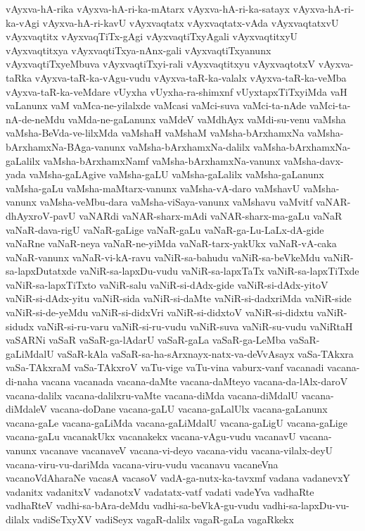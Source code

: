 {vAyxva-hA-rika
vAyxva-hA-ri-ka-mAtarx
vAyxva-hA-ri-ka-satayx
vAyxva-hA-ri-ka-vAgi
vAyxva-hA-ri-kavU
vAyxvaqtatx
vAyxvaqtatx-vAda
vAyxvaqtatxvU
vAyxvaqtitx
vAyxvaqTiTx-gAgi
vAyxvaqtiTxyAgali
vAyxvaqtitxyU
vAyxvaqtitxya
vAyxvaqtiTxya-nAnx-gali
vAyxvaqtiTxyanunx
vAyxvaqtiTxyeMbuva
vAyxvaqtiTxyi-rali
vAyxvaqtitxyu
vAyxvaqtotxV
vAyxva-taRka
vAyxva-taR-ka-vAgu-vudu
vAyxva-taR-ka-valalx
vAyxva-taR-ka-veMba
vAyxva-taR-ka-veMdare
vUyxha
vUyxha-ra-shimxnf
vUyxtapxTiTxyiMda
vaH
vaLanunx
vaM
vaMca-ne-yilalxde
vaMcasi
vaMci-suva
vaMci-ta-nAde
vaMci-ta-nA-de-neMdu
vaMda-ne-gaLanunx
vaMdeV
vaMdhAyx
vaMdi-su-venu
vaMsha
vaMsha-BeVda-ve-lilxMda
vaMshaH
vaMshaM
vaMsha-bArxhamxNa
vaMsha-bArxhamxNa-BAga-vanunx
vaMsha-bArxhamxNa-dalilx
vaMsha-bArxhamxNa-gaLalilx
vaMsha-bArxhamxNamf
vaMsha-bArxhamxNa-vanunx
vaMsha-davx-yada
vaMsha-gaLAgive
vaMsha-gaLU
vaMsha-gaLalilx
vaMsha-gaLanunx
vaMsha-gaLu
vaMsha-maMtarx-vanunx
vaMsha-vA-daro
vaMshavU
vaMsha-vanunx
vaMsha-veMbu-dara
vaMsha-viSaya-vanunx
vaMshavu
vaMvitf
vaNAR-dhAyxroV-pavU
vaNARdi
vaNAR-sharx-mAdi
vaNAR-sharx-ma-gaLu
vaNaR
vaNaR-dava-rigU
vaNaR-gaLige
vaNaR-gaLu
vaNaR-ga-Lu-LaLx-dA-gide
vaNaRne
vaNaR-neya
vaNaR-ne-yiMda
vaNaR-tarx-yakUkx
vaNaR-vA-caka
vaNaR-vanunx
vaNaR-vi-kA-ravu
vaNiR-sa-bahudu
vaNiR-sa-beVkeMdu
vaNiR-sa-lapxDutatxde
vaNiR-sa-lapxDu-vudu
vaNiR-sa-lapxTaTx
vaNiR-sa-lapxTiTxde
vaNiR-sa-lapxTiTxto
vaNiR-salu
vaNiR-si-dAdx-gide
vaNiR-si-dAdx-yitoV
vaNiR-si-dAdx-yitu
vaNiR-sida
vaNiR-si-daMte
vaNiR-si-dadxriMda
vaNiR-side
vaNiR-si-de-yeMdu
vaNiR-si-didxVri
vaNiR-si-didxtoV
vaNiR-si-didxtu
vaNiR-sidudx
vaNiR-si-ru-varu
vaNiR-si-ru-vudu
vaNiR-suva
vaNiR-su-vudu
vaNiRtaH
vaSARNi
vaSaR
vaSaR-ga-lAdarU
vaSaR-gaLa
vaSaR-ga-LeMba
vaSaR-gaLiMdalU
vaSaR-kAla
vaSaR-sa-ha-sArxnayx-natx-va-deVvAsayx
vaSa-TAkxra
vaSa-TAkxraM
vaSa-TAkxroV
vaTu-vige
vaTu-vina
vaburx-vanf
vacanadi
vacana-di-naha
vacana
vacanada
vacana-daMte
vacana-daMteyo
vacana-da-lAlx-daroV
vacana-dalilx
vacana-dalilxru-vaMte
vacana-diMda
vacana-diMdalU
vacana-diMdaleV
vacana-doDane
vacana-gaLU
vacana-gaLalUlx
vacana-gaLanunx
vacana-gaLe
vacana-gaLiMda
vacana-gaLiMdalU
vacana-gaLigU
vacana-gaLige
vacana-gaLu
vacanakUkx
vacanakekx
vacana-vAgu-vudu
vacanavU
vacana-vanunx
vacanave
vacanaveV
vacana-vi-deyo
vacana-vidu
vacana-vilalx-deyU
vacana-viru-vu-dariMda
vacana-viru-vudu
vacanavu
vacaneVna
vacanoVdAharaNe
vacasA
vacasoV
vadA-ga-nutx-ka-tavxmf
vadana
vadanevxY
vadanitx
vadanitxV
vadanotxV
vadatatx-vatf
vadati
vadeYva
vadhaRte
vadhaRteV
vadhi-sa-bAra-deMdu
vadhi-sa-beVkA-gu-vudu
vadhi-sa-lapxDu-vu-dilalx
vadiSeTxyXV
vadiSeyx
vagaR-dalilx
vagaR-gaLa
vagaRkekx
}
